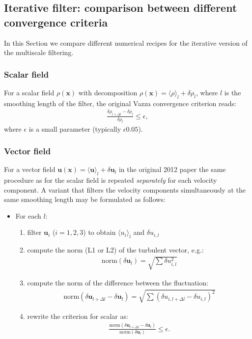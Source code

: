 \documentclass[]{article}
\begin{document}
\subsection{Iterative filter: comparison between different convergence criteria}

In this Section we compare different numerical recipes for the iterative version of the multiscale filtering.

\subsubsection{Scalar field}

For a scalar field $\rho (\bm x)$ with decomposition $\rho (\bm x) = \langle \rho \rangle_l + \delta \rho_l $, where $l$ is the smoothing length of the filter, the original Vazza convergence criterion reads:
%
\begin{align}
	\frac{\delta \rho_{l + \Delta l} - \delta \rho_{l}}{\delta \rho_{l}} \leq \epsilon,
\end{align} 
%
where $\epsilon$ is a small parameter (typically $\epsilon 0.05$).

\subsubsection{Vector field}

For a vector field $\bm u (\bm x) = \langle \bm u \rangle_l + \delta \bm u_l$ in the original 2012 paper the same procedure as for the scalar field is repeated \textit{separately} for each velocity component. A variant that filters the velocity components simultaneously at the same smoothing length may be formulated as follows:
%
\begin{itemize}
	\item For each $l$:
	\begin{enumerate}
		\item filter $\bm u_i$ ($i=1,2,3$) to obtain $\langle u_i \rangle_l$ and $\delta u_{i,l}$
		\item compute the norm (L1 or L2) of the turbulent vector, e.g.:
		\begin{align}
			\mathrm{norm}(\delta \bm u_l) = \sqrt{ \sum \delta u_{i,l}^2}
		\end{align}
		\item compute the norm of the difference between the fluctuation:
		\begin{align}
			\mathrm{norm}(\delta \bm u_{l+\Delta l} - \delta \bm u_l) = \sqrt{ \sum (\delta u_{i,l+\Delta l} - \delta u_{i,l})^2}
		\end{align}
		\item rewrite the criterion for scalar as:
		\begin{align}
			\frac{\mathrm{norm}(\delta \bm u_{l+\Delta l} - \delta \bm u_l)}{\mathrm{norm}(\delta \bm u_l)} \leq \epsilon.
		\end{align}
	\end{enumerate}
\end{itemize}
\end{document}
